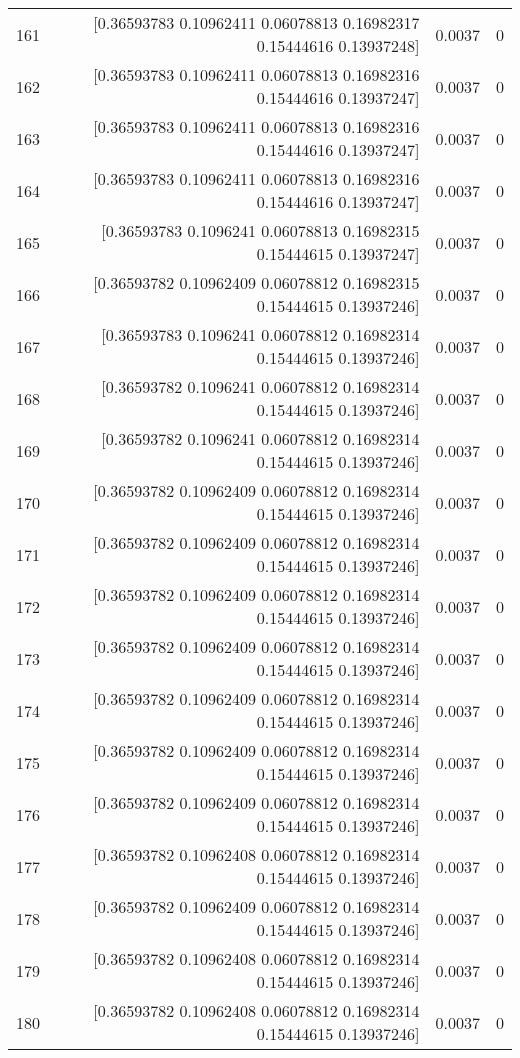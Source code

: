 \begin{longtable}{lrrr}
161 & [0.36593783 0.10962411 0.06078813 0.16982317 0.15444616 0.13937248] & 0.0037 & 0 \\
162 & [0.36593783 0.10962411 0.06078813 0.16982316 0.15444616 0.13937247] & 0.0037 & 0 \\
163 & [0.36593783 0.10962411 0.06078813 0.16982316 0.15444616 0.13937247] & 0.0037 & 0 \\
164 & [0.36593783 0.10962411 0.06078813 0.16982316 0.15444616 0.13937247] & 0.0037 & 0 \\
165 & [0.36593783 0.1096241  0.06078813 0.16982315 0.15444615 0.13937247] & 0.0037 & 0 \\
166 & [0.36593782 0.10962409 0.06078812 0.16982315 0.15444615 0.13937246] & 0.0037 & 0 \\
167 & [0.36593783 0.1096241  0.06078812 0.16982314 0.15444615 0.13937246] & 0.0037 & 0 \\
168 & [0.36593782 0.1096241  0.06078812 0.16982314 0.15444615 0.13937246] & 0.0037 & 0 \\
169 & [0.36593782 0.1096241  0.06078812 0.16982314 0.15444615 0.13937246] & 0.0037 & 0 \\
170 & [0.36593782 0.10962409 0.06078812 0.16982314 0.15444615 0.13937246] & 0.0037 & 0 \\
171 & [0.36593782 0.10962409 0.06078812 0.16982314 0.15444615 0.13937246] & 0.0037 & 0 \\
172 & [0.36593782 0.10962409 0.06078812 0.16982314 0.15444615 0.13937246] & 0.0037 & 0 \\
173 & [0.36593782 0.10962409 0.06078812 0.16982314 0.15444615 0.13937246] & 0.0037 & 0 \\
174 & [0.36593782 0.10962409 0.06078812 0.16982314 0.15444615 0.13937246] & 0.0037 & 0 \\
175 & [0.36593782 0.10962409 0.06078812 0.16982314 0.15444615 0.13937246] & 0.0037 & 0 \\
176 & [0.36593782 0.10962409 0.06078812 0.16982314 0.15444615 0.13937246] & 0.0037 & 0 \\
177 & [0.36593782 0.10962408 0.06078812 0.16982314 0.15444615 0.13937246] & 0.0037 & 0 \\
178 & [0.36593782 0.10962409 0.06078812 0.16982314 0.15444615 0.13937246] & 0.0037 & 0 \\
179 & [0.36593782 0.10962408 0.06078812 0.16982314 0.15444615 0.13937246] & 0.0037 & 0 \\
180 & [0.36593782 0.10962408 0.06078812 0.16982314 0.15444615 0.13937246] & 0.0037 & 0 \\

\end{longtable}
